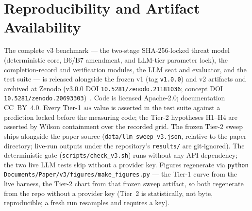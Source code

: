 \documentclass[11pt]{article}
\newcommand{\ais}{\textsc{ais}}
\newcommand{\code}[1]{\texttt{#1}}
\begin{document}
\section*{Reproducibility and Artifact Availability}
The complete v3 benchmark --- the two-stage SHA-256-locked threat model
(deterministic core, B6/B7 amendment, and LLM-tier parameter lock), the
completion-record and verification modules, the LLM seat and evaluator, and the
test suite --- is released alongside the frozen v1 (tag \code{v1.0.0}) and v2
artifacts and archived at Zenodo (v3.0.0 DOI \code{10.5281/zenodo.21181036};
concept DOI \code{10.5281/zenodo.20693303})~\cite{aegisv3zenodo}. Code is licensed
Apache-2.0; documentation CC~BY~4.0. Every Tier-1
\ais{} value is asserted in the test suite against a prediction locked before the
measuring code; the Tier-2 hypotheses H1--H4 are asserted by Wilson containment
over the recorded grid. The frozen Tier-2 sweep ships alongside the paper source
(\code{data/llm\_sweep\_v3.json}, relative to the paper directory; live-run
outputs under the repository's \code{results/} are git-ignored). The deterministic gate
(\code{scripts/check\_v3.sh}) runs without any API dependency; the two live LLM
tests skip without a provider key. Figures regenerate via \code{python
Documents/Paper/v3/figures/make\_figures.py} --- the Tier-1 curve from the live
harness, the Tier-2 chart from that frozen sweep artifact, so both regenerate from
the repo without a provider key (Tier~2 is statistically, not byte, reproducible;
a fresh run resamples and requires a key).
\end{document}
